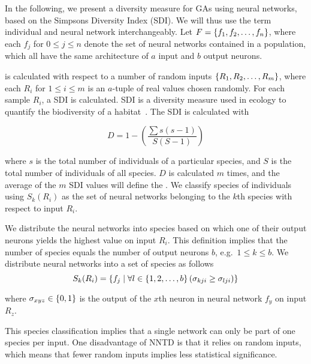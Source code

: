 \section{\di{}}
In the following, we present a diversity measure for GAs using neural networks, based on the Simpsons Diversity Index (SDI). We will thus use the term individual and neural network interchangeably. Let $F = \left\{ f_1, f_2, \dots, f_n \right\}$, where each $f_j$ for $0 \leq j \leq n$ denote the set of neural networks contained in a population, which all have the same architecture of $a$ input and $b$ output neurons. 

\di{} is calculated with respect to a number of random inputs $\left\{ R_1, R_2, \dots, R_m \right\}$, where each $R_i$ for $1 \leq i \leq m$ is an $a$-tuple of real values chosen randomly. For each sample $R_i$, a SDI is calculated. SDI is a diversity measure used in ecology to quantify the biodiversity of a habitat~\cite{simpson1949measurement}. The SDI is calculated with

\begin{equation*}\label{eq:sdi}
  D = 1 - \left(\frac{\sum{s (s - 1)}}{S (S - 1)}\right) 
\end{equation*}

where $s$ is the total number of individuals of a particular species, and $S$ is the total number of individuals of all species. $D$ is calculated $m$ times, and the average of the $m$ SDI values will define the \dia{}. We classify species of individuals using $S_k(R_i)$ as the set of neural networks belonging to the $k$th species with respect to input $R_i$.

We distribute the neural networks into species based on which one of their output neurons yields the highest value on input $R_i$. %
This definition implies that the number of species equals the number of output neurons $b$, e.g.\ $1 \leq k \leq b$. We distribute neural networks into a set of species as follows
%
\begin{equation*}\label{eq:species}
  S_k(R_i) = \left\{ f_j \mid \forall l \in \left\{ 1, 2, \dots, b \right\} \left(\sigma_{kji} \geq \sigma_{lji}\right) \right\}
\end{equation*}
%

where $\sigma_{xyz} \in \left\{ 0, 1 \right\}$ is the output of the $x$th neuron in neural network $f_y$ on input $R_z$.

This species classification implies that a single network can only be part of one species per input. One disadvantage of NNTD is that it relies on random inputs, which means that fewer random inputs implies less statistical significance.
